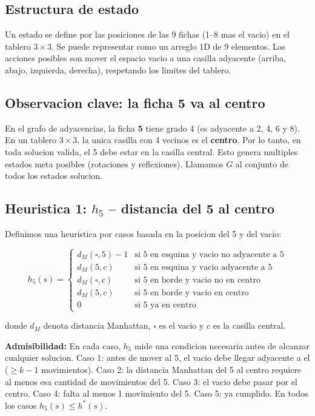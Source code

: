 \documentclass[12pt, a4paper]{article}
\begin{document}
\subsection{Estructura de estado}

Un estado se define por las posiciones de las 9 fichas (1--8 mas el vacio) en el tablero $3 \times 3$. Se puede representar como un arreglo 1D de 9 elementos. Las acciones posibles son mover el espacio vacio a una casilla adyacente (arriba, abajo, izquierda, derecha), respetando los limites del tablero.

\subsection{Observacion clave: la ficha 5 va al centro}

En el grafo de adyacencias, la ficha \textbf{5} tiene grado 4 (es adyacente a 2, 4, 6 y 8). En un tablero $3 \times 3$, la unica casilla con 4 vecinos es el \textbf{centro}. Por lo tanto, en toda solucion valida, el 5 debe estar en la casilla central. Esto genera multiples estados meta posibles (rotaciones y reflexiones). Llamamos $G$ al conjunto de todos los estados solucion.

\subsection{Heuristica 1: $h_5$ -- distancia del 5 al centro}

Definimos una heuristica por casos basada en la posicion del 5 y del vacio:

$$
h_5(s) = \begin{cases}
d_M(\square, 5) - 1 & \text{si 5 en esquina y vacio no adyacente a 5} \\
d_M(5, c) & \text{si 5 en esquina y vacio adyacente a 5} \\
d_M(\square, c) & \text{si 5 en borde y vacio no en centro} \\
d_M(5, c) & \text{si 5 en borde y vacio en centro} \\
0 & \text{si 5 ya en centro}
\end{cases}
$$

donde $d_M$ denota distancia Manhattan, $\square$ es el vacio y $c$ es la casilla central.

\textbf{Admisibilidad:} En cada caso, $h_5$ mide una condicion necesaria antes de alcanzar cualquier solucion. Caso 1: antes de mover al 5, el vacio debe llegar adyacente a el ($\geq k-1$ movimientos). Caso 2: la distancia Manhattan del 5 al centro requiere al menos esa cantidad de movimientos del 5. Caso 3: el vacio debe pasar por el centro. Caso 4: falta al menos 1 movimiento del 5. Caso 5: ya cumplido. En todos los casos $h_5(s) \leq h^*(s)$.
\end{document}
